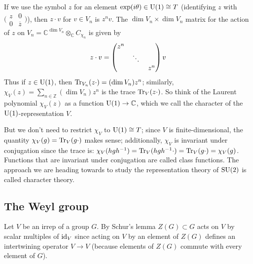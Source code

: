 \documentclass[../../rtnotes.tex]{subfiles}
\begin{document}
If we use the symbol $z$ for an element $\exp(i\theta)\in \operatorname{U}(1)\cong T$ (identifying $z$ with $\bigl(\!\begin{smallmatrix}
    z & 0 \\ 0 & \overline z
\end{smallmatrix}\!\bigr)$), then $z\cdot v$ for $v\in V_n$ is $z^nv$. The $\dim V_n\times \dim V_n$ matrix for the action of $z$ on $V_n = \mathbb C^{\dim V_n}\otimes_{\mathbb C}C_{\chi_n}$ is given by
\[z\cdot v = \begin{pmatrix}
    z^n & & \\
    & \mathbin{\rotatebox[origin=c]{-10}{$\ddots$}} & \\
    & & z^n
\end{pmatrix}v\]
Thus if $z\in\operatorname{U}(1)$, then $\Tr_{V_n}(z\cdot) = (\dim V_n)z^n$; similarly, $\chi_V(z) = \sum_{n\in\mathbb Z}(\dim V_n)z^n$ is the trace $\Tr_V(z\cdot)$. So think of the Laurent polynomial $\chi_V(z)$ as a function $\operatorname{U}(1)\to \mathbb C$, which we call the character of the $\operatorname{U}(1)$-representation $V$.

But we don't need to restrict $\chi_V$ to $\operatorname{U}(1)\cong T$; since $V$ is finite-dimensional, the quantity $\chi_V(g) = \Tr_V(g\cdot)$ makes sense; additionally, $\chi_V$ is invariant under conjugation since the trace is: $\chi_V(hgh^{-1}) = \Tr_V(hgh^{-1}\cdot) = \Tr_V(g\cdot) = \chi_V(g)$. Functions that are invariant under conjugation are called class functions. The approach we are heading towards to study the representation theory of $\operatorname{SU}(2)$ is called character theory.

\subsection{The Weyl group}
Let $V$ be an irrep of a group $G$. By Schur's lemma $Z(G)\subset G$ acts on $V$ by scalar multiples of $\operatorname{id}_V$ since acting on $V$ by an element of $Z(G)$ defines an intertwining operator $V\to V$ (because elements of $Z(G)$ commute with every element of $G$).
\end{document}
